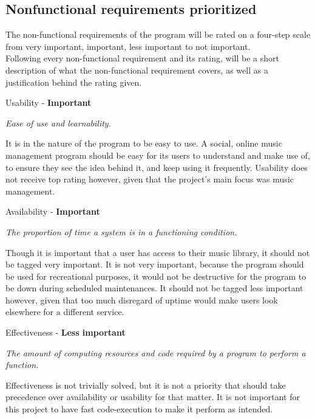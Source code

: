 \subsection{Nonfunctional requirements prioritized}


The non-functional requirements of the program will be rated on a four-step scale from very important, important, less important to not important.
\\
Following every non-functional requirement and its rating, will be a short description of what the non-functional requirement covers, as well as a justification behind the rating given.
\newpage

\noindent
Usability - \textbf{Important}

\vspace{5 mm}
\noindent
\textit{Ease of use and learnability.}

\vspace{5 mm}

\noindent
It is in the nature of the program to be easy to use. A social, online music management program should be easy for its users to understand and make use of, to ensure they see the idea behind it, and keep using it frequently. Usability does not receive top rating however, given that the project's main focus was music management.

\vspace{5 mm}
\noindent
Availability - \textbf{Important}

\vspace{5 mm}
\noindent
\textit{The proportion of time a system is in a functioning condition.}

\vspace{5 mm}
\noindent
Though it is important that a user has access to their music library, it should not be tagged very important. It is not very important, because the program should be used for recreational purposes, it would not be destructive for the program to be down during scheduled maintenances. It should not be tagged less important however, given that too much disregard of uptime would make users look elsewhere for a different service.

\vspace{5 mm}
\noindent
Effectiveness - \textbf{Less important}

\vspace{5 mm}
\noindent
\textit{The amount of computing resources and code required by a program to perform a function.}

\vspace{5 mm}
\noindent
Effectiveness is not trivially solved, but it is not a priority that should take precedence over availability or usability for that matter. It is not important for this project to have fast code-execution to make it perform as intended.

